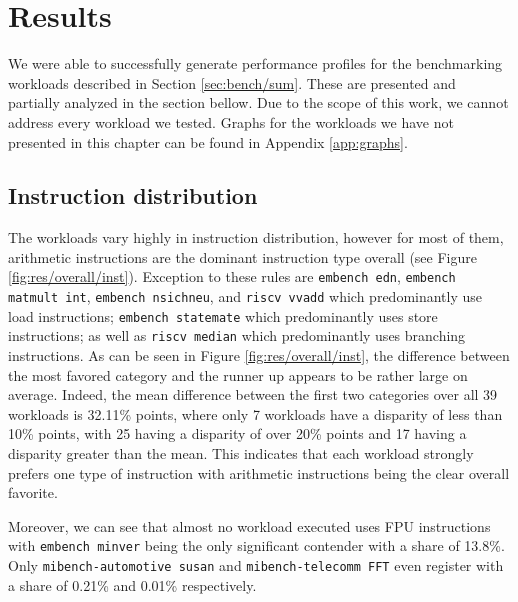 \documentclass[../bachelor_paper.tex]{subfiles}
\begin{document}
\chapter{Results}
    \label{ch:res}

We were able to successfully generate performance profiles for the benchmarking workloads described in Section \ref{sec:bench/sum}. These are presented and partially analyzed in the section bellow. Due to the scope of this work, we cannot address every workload we tested. Graphs for the workloads we have not presented in this chapter can be found in Appendix \ref{app:graphs}.

\section{Instruction distribution}
The workloads vary highly in instruction distribution, however for most of them, arithmetic instructions are the dominant instruction type overall (see Figure \ref{fig:res/overall/inst}). Exception to these rules are \texttt{embench edn}, \texttt{embench matmult int}, \texttt{embench nsichneu}, and \texttt{riscv vvadd} which predominantly use load instructions; \texttt{embench statemate} which predominantly uses store instructions; as well as \texttt{riscv median} which predominantly uses branching instructions. As can be seen in Figure \ref{fig:res/overall/inst}, the difference between the most favored category and the runner up appears to be rather large on average. Indeed, the mean difference between the first two categories over all 39 workloads is 32.11\% points, where only 7 workloads have a disparity of less than 10\% points, with 25 having a disparity of over 20\% points and 17 having a disparity greater than the mean. This indicates that each workload strongly prefers one type of instruction with arithmetic instructions being the clear overall favorite. 

Moreover, we can see that almost no workload executed uses FPU instructions with \texttt{embench minver} being the only significant contender with a share of 13.8\%. Only \texttt{mibench-automotive susan} and \texttt{mibench-telecomm FFT} even register with a share of 0.21\% and 0.01\% respectively.
\end{document}
